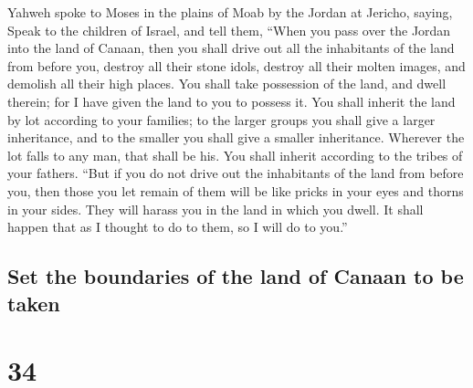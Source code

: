  Yahweh spoke to Moses in the plains of Moab by the
Jordan at Jericho, saying,  Speak to the children of
Israel, and tell them, ``When you pass over the Jordan into the land of
Canaan,  then you shall drive out all the inhabitants of
the land from before you, destroy all their stone idols, destroy all
their molten images, and demolish all their high places. 
You shall take possession of the land, and dwell therein; for I have
given the land to you to possess it.  You shall inherit
the land by lot according to your families; to the larger groups you
shall give a larger inheritance, and to the smaller you shall give a
smaller inheritance. Wherever the lot falls to any man, that shall be
his. You shall inherit according to the tribes of your fathers.
 ``But if you do not drive out the inhabitants of the
land from before you, then those you let remain of them will be like
pricks in your eyes and thorns in your sides. They will harass you in
the land in which you dwell.  It shall happen that as I
thought to do to them, so I will do to you.''

\hypertarget{set-the-boundaries-of-the-land-of-canaan-to-be-taken}{%
\subsection{Set the boundaries of the land of Canaan to be
taken}\label{set-the-boundaries-of-the-land-of-canaan-to-be-taken}}

\hypertarget{section-33}{%
\section{34}\label{section-33}}

